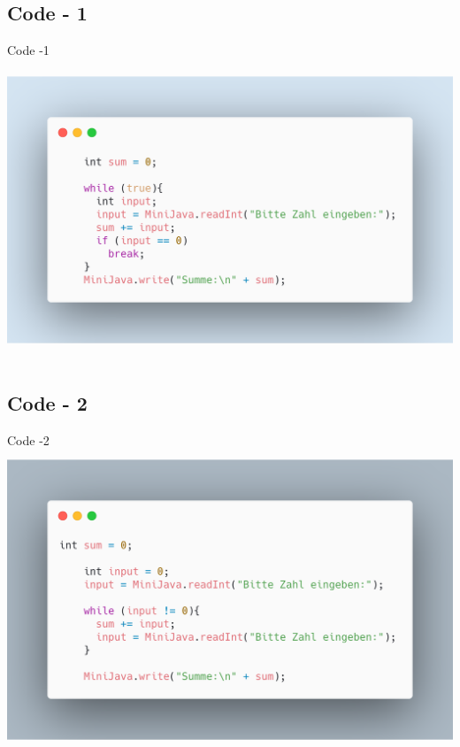 \documentclass[handout, navsym]{tum-presentation}
\numberwithin{equation}{section}
\begin{document}
\subsection{Code - 1}
\begin{frame}{Code -1}
\center \includegraphics[height=9cm]{p1-code.png}
\end{frame}

\subsection{Code - 2}
\begin{frame}{Code -2}
\center \includegraphics[height=9cm]{p1-2-code.png}
\end{frame}
\end{document}
